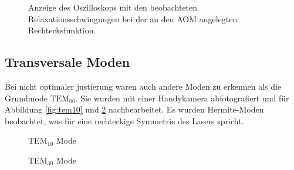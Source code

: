 \documentclass[11pt,twoside=true]{scrartcl}
\begin{document}
\begin{figure}[h!]
\begin{floatrow}
{      \label{fig:relaxation_osci}
    } {
      \caption{Anzeige des Oszilloskops mit den beobachteten Relaxationsschwingungen bei
      der an den AOM angelegten Rechtecksfunktion.}
    }
  \end{floatrow}
\end{figure}


\subsection{Transversale Moden}
Bei nicht optimaler justierung waren auch andere Moden zu erkennen als die 
Grundmode $\text{TEM}_{00}$. Sie wurden mit einer Handykamera abfotografiert und
für Abbildung \ref{fig:tem10} und \ref{fig:tem20} nachbearbeitet. Es wurden 
Hermite-Moden beobachtet, was für eine rechteckige Symmetrie des Lasers spricht. 

\begin{figure}[h!]
  \begin{floatrow}
     {
      \caption{TEM$_{10}$ Mode}
      \label{fig:tem10}
    }
     {
      \caption{TEM$_{30}$ Mode}
      \label{fig:tem20}
    }
  \end{floatrow}
\end{figure}
\end{document}
